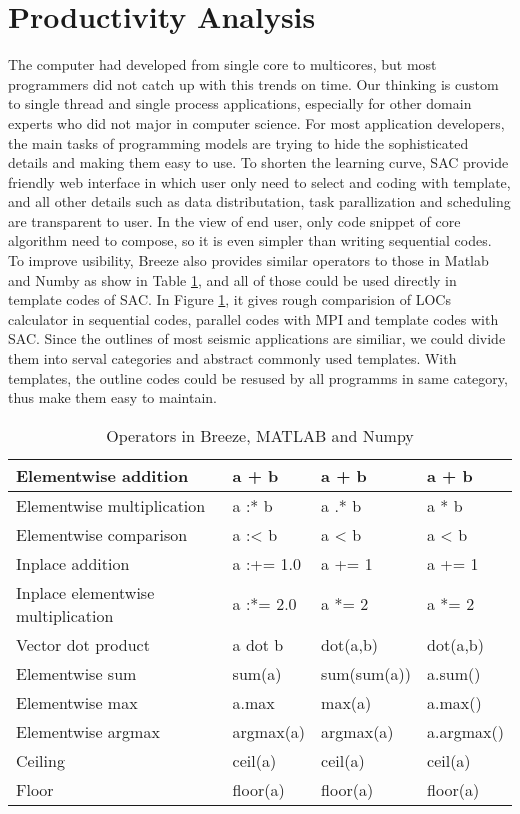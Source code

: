 \section{Productivity Analysis}
The computer had developed from single core to multicores, but most programmers did not catch up with this trends on time. Our thinking is custom to single thread and single process applications, especially for other domain experts who did not major in computer science. For most application developers, the main tasks of programming models are trying to hide the sophisticated details and making them easy to use. To shorten the learning curve, SAC provide friendly web interface in which user only need to select and coding with template, and all other details such as data distributation, task parallization and scheduling are transparent to user. In the view of end user, only code snippet of core algorithm need to compose, so it is even simpler than writing sequential codes. To improve usibility, Breeze also provides similar operators to those in Matlab and Numby as show in Table \ref{tab:BreezeOperators}, and all of those could be used directly in template codes of SAC. In Figure \ref{}, it gives rough comparision of LOCs calculator in sequential codes, parallel codes with MPI and template codes with SAC. Since the outlines of most seismic applications are similiar, we could divide them into serval categories and abstract commonly used templates. With templates, the outline codes could be resused by all programms in same category, thus make them easy to maintain.   


\begin{table}[H]
\centering
\caption{Operators in Breeze, MATLAB and Numpy}
\begin{tabular}{|l|l|l|l|}
\hline
Elementwise addition & a + b & a + b & a + b \\
\hline
Elementwise multiplication & a :* b & a .* b & a * b \\
\hline
Elementwise comparison & a :\textless{}  b & a \textless{}  b & a \textless{}  b \\
\hline
Inplace addition & a :+= 1.0 & a += 1 & a += 1 \\
\hline
Inplace elementwise multiplication & a :*= 2.0 & a *= 2 & a *= 2 \\
\hline
Vector dot product & a dot b & dot(a,b)	& dot(a,b) \\
\hline
Elementwise sum	& sum(a) & sum(sum(a)) & a.sum() \\
\hline
Elementwise max & a.max & max(a) & a.max() \\
\hline
Elementwise argmax & argmax(a) & argmax(a) & a.argmax() \\
\hline
Ceiling	& ceil(a) & ceil(a) & ceil(a) \\
\hline
Floor	& floor(a) & floor(a) & floor(a) \\
\hline
\end{tabular}
\label{tab:BreezeOperators}
\end{table}


